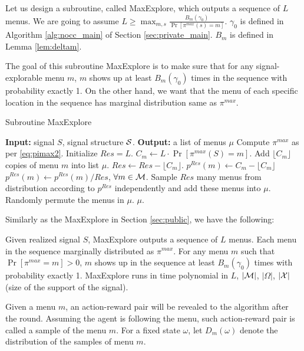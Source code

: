 Let us design a subroutine, called  MaxExplore, which outputs a sequence of $L$ menus. We are going to assume $L \geq \max_{m,s} \frac{B_m(\gamma_0)}{ \Pr[\pi^{max}(s)=m]}$. $\gamma_0$ is defined in Algorithm \ref{alg:nocc_main} of Section \ref{sec:private_main}. $B_m$ is defined in Lemma \ref{lem:deltam}.

The goal of this subroutine MaxExplore is to make sure that for any signal-explorable menu $m$, $m$ shows up at least $B_m(\gamma_0)$ times in the sequence with probability exactly 1. On the other hand, we want that the menu of each specific location in the sequence has marginal distribution same as $\pi^{max}$.

 \begin{algorithm}[H]
    \caption{Subroutine MaxExplore}
    	\label{alg:nocc_explore}
    \begin{algorithmic}[1]
	\STATE \textbf{Input:} signal $S$, signal structure $\S$.
	\STATE \textbf{Output:} a list of menus $\mu$
	\STATE Compute $\pi^{max}$ as per \eqref{eq:pimax2}.
		\STATE Initialize $Res = L$.
			\STATE $C_m \leftarrow L \cdot \Pr[\pi^{max}(S) = m]$.
                     		\STATE Add $\lfloor C_m\rfloor$ copies of menu $m$ into list $\mu$.
			\STATE $Res \leftarrow Res -\lfloor C_m \rfloor $.
			\STATE $p^{Res}(m)\leftarrow  C_m -  \lfloor C_m\rfloor$
		\ENDFOR
		\STATE $p^{Res}(m) \leftarrow p^{Res}(m) / Res$, $\forall m \in \M$.
		\STATE Sample $Res$ many menus from distribution according to $p^{Res}$ independently and add these menus into $\mu$.
		\STATE Randomly permute the menus in $\mu$.
	\RETURN $\mu$.	
     \end{algorithmic}
\end{algorithm}

Similarly as the MaxExplore in Section \ref{sec:public}, we have the following:
\begin{claim}
\label{clm:maxexplore_nocc}
Given realized signal $S$, MaxExplore outputs a sequence of $L$ menus. Each menu in the sequence marginally distributed as $\pi^{max}$. For any menu $m$ such that $\Pr[\pi^{max} = m] >0$, $m$ shows up in the sequence at least $B_m(\gamma_0)$ times with probability exactly 1. MaxExplore runs in time polynomial in $L$, $|\M|$, $|\varOmega|$, $|\X|$ (size of the support of the signal).
\end{claim}

Given a menu $m$, an action-reward pair will be revealed to the algorithm after the round. Assuming the agent is following the menu, such action-reward pair is called a sample of the menu $m$.  For a fixed state $\omega$, let $D_m(\omega)$ denote the distribution of the samples of menu $m$.

